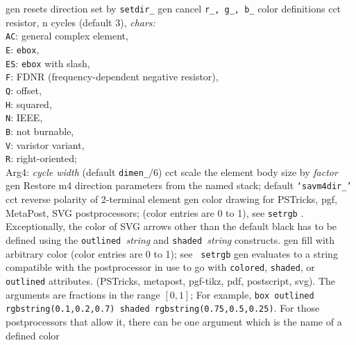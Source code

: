 %
  {gen}%
  {resets direction set by {\tt setdir\_}}%
%
  {gen}%
  {cancel {\tt r\_, g\_, b\_} color definitions}%
%
  {cct}%
  {resistor, n cycles (default 3), {\sl chars:}\\
    {\tt AC}: general complex element,\\
    {\tt E}: {\tt ebox},\\
    {\tt ES}: {\tt ebox} with slash,\\
    {\tt F}: FDNR (frequency-dependent negative resistor),\\
    {\tt Q}: offset,\\
    {\tt H}: squared,\\
    {\tt N}: IEEE,\\
    {\tt B}: not burnable,\\
    {\tt V}: varistor variant,\\
    {\tt R}: right-oriented;\\
    Arg4: {\sl cycle width} (default {\tt dimen\_}$/6$)
   }%
%
  {cct}%
  {scale the element body size by {\sl factor}}%
%
  {gen}%
  {Restore m4 direction parameters from the named stack;
    default {\tt `savm4dir\_'}}%
%
  {cct}%
  {reverse polarity of 2-terminal element}%
%
  {gen}%
  {color drawing for PSTricks, pgf, MetaPost, SVG postprocessors;
   (color entries are 0 to 1),
   see {\tt setrgb} .  Exceptionally, the color
   of SVG arrows other than the default black has to be defined using the
   {\tt outlined }{\sl string} and {\tt shaded }{\sl string} constructs.}%
%
  {gen}%
  {fill with arbitrary color (color entries are 0 to 1); see {\tt
   setrgb}}%
%
  {gen}%
  {evaluates to a string compatible with the postprocessor in use
   to go with {\tt colored}, {\tt shaded}, or {\tt outlined} attributes.
   (PSTricks, metapost, pgf-tikz, pdf, postscript, svg).  The arguments
   are fractions in the range $[0,1]$; For example, {\tt box outlined
   rgbstring(0.1,0.2,0.7) shaded rgbstring(0.75,0.5,0.25)}.  For those
   postprocessors that allow it, there can be one argument which is the
   name of a defined color}%
